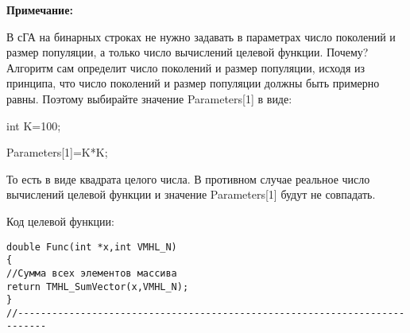 \documentclass[a4paper,12pt]{article}
\begin{document}
\textbf{Примечание:}

 В сГА на бинарных строках не нужно задавать в параметрах число поколений и размер популяции, а только число вычислений целевой функции. Почему? Алгоритм сам определит число поколений и размер популяции, исходя из принципа, что число поколений и размер популяции должны быть примерно равны. Поэтому выбирайте значение Parameters[1] в виде:

int K=100;

Parameters[1]=K*K;

То есть в виде квадрата целого числа. В противном случае реальное число вычислений целевой функции и значение Parameters[1] будут не совпадать.

Код целевой функции:
\begin{lstlisting}[caption=Оптимизируемая функция]
double Func(int *x,int VMHL_N)
{
//Сумма всех элементов массива
return TMHL_SumVector(x,VMHL_N);
}
//---------------------------------------------------------------------------
\end{lstlisting}
\end{document}
